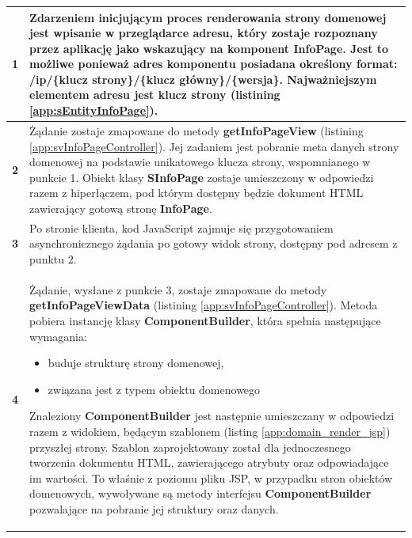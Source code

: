 \begin{center}
\begin{longtable}{| p{2.5cm} | p{13cm} |}
			\textbf{1}							&
			Zdarzeniem inicjującym proces renderowania strony domenowej jest wpisanie w przeglądarce adresu, 
			który zostaje rozpoznany przez aplikację jako wskazujący na komponent \textbf{InfoPage}. Jest to możliwe ponieważ 
			adres komponentu posiadana określony format: \textbf{/ip/\{klucz strony\}/\{klucz główny\}/\{wersja\}}. Najważniejszym elementem
			adresu jest \textbf{klucz strony} (listining \ref{app:sEntityInfoPage}). 
			\tabularnewline
			\hline
			\textbf{2}							&
			Żądanie zostaje zmapowane do metody \textbf{getInfoPageView} (listining \ref{app:svInfoPageController}). Jej zadaniem jest
			pobranie meta danych strony domenowej na podstawie unikatowego klucza strony, wspomnianego w punkcie 1. Obiekt klasy \textbf{SInfoPage}
			zostaje umieszczony w odpowiedzi razem z hiperłączem, pod którym dostępny będzie dokument HTML zawierający gotową stronę \textbf{InfoPage}.
			\tabularnewline
			\hline
			\textbf{3}							&
			Po stronie klienta, kod JavaScript zajmuje się przygotowaniem asynchronicznego żądania po gotowy widok strony, dostępny pod adresem
			z punktu 2.
			\tabularnewline
			\hline
			\textbf{4}							&
			Żądanie, wysłane z punkcie 3, zostaje zmapowane do metody \textbf{getInfoPageViewData} (listining \ref{app:svInfoPageController}). Metoda pobiera instancję
			klasy \textbf{ComponentBuilder}, która spełnia następujące wymagania:
			\begin{itemize}
				\item buduje strukturę strony domenowej,
				\item związana jest z typem obiektu domenowego
			\end{itemize}
			Znaleziony \textbf{ComponentBuilder} jest następnie umieszczany w odpowiedzi razem z widokiem, będącym szablonem (listing \ref{app:domain_render_jsp}) przyszłej strony.
			Szablon zaprojektowany został dla jednoczesnego tworzenia dokumentu HTML, zawierającego atrybuty oraz odpowiadające im wartości. 
			To właśnie z poziomu pliku JSP, w przypadku stron obiektów domenowych, wywoływane są metody 
			interfejsu \textbf{ComponentBuilder} pozwalające na pobranie jej struktury oraz danych. 
		\end{longtable}
	\end{center}
	

